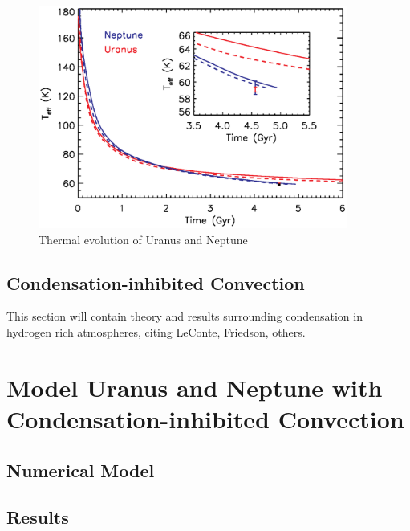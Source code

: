 \documentclass[11pt]{ucscthesisbs}
\begin{document}
\begin{figure}[ht!]
 \centerline{
  \includegraphics[width=4.0in]{figures/f10.eps}
 }
\caption[This is just a placeholder for our own plot]
{Thermal evolution of Uranus and Neptune 
}

\label{fig:discretescan}
\end{figure}


\section{Condensation-inhibited Convection}\label{condensation_background}

This section will contain theory and results surrounding condensation in hydrogen rich atmospheres, citing LeConte, Friedson, others.


\chapter{Model Uranus and Neptune with Condensation-inhibited Convection}

\section{Numerical Model}

\section{Results}
\end{document}
